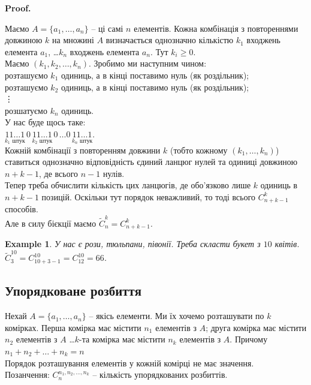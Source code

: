 \documentclass[a4paper, 14pt]{extarticle}
\makeatletter
\theoremstyle{theoremdd}
\theoremstyle{theoremdd}
\theoremstyle{theoremdd}
\theoremstyle{theoremdd}
\theoremstyle{theoremdd}
\newtheorem{example}[theorem]{Example}
\theoremstyle{theoremdd}
\theoremstyle{theoremdd}
\theoremstyle{theoremdd}
\theoremstyle{theoremdd}
\theoremstyle{theoremdd}
\theoremstyle{theoremdd}
\theoremstyle{theoremdd}
\theoremstyle{theoremdd}
\theoremstyle{theoremdd}
\theoremstyle{theoremdd}
\renewenvironment{proof}[1][Proof.\\]{\par
\pushQED{\hfill \qed}%
\normalfont \topsep6\p@\@plus6\p@\relax
\trivlist
\item\relax
{\bfseries
#1\@addpunct{.}}\hspace\labelsep\ignorespaces
}{%
\popQED\endtrivlist\@endpefalse
}
\makeatother
\begin{document}
\begin{proof}
Маємо $A = \{a_1,\dots,a_n\}$ -- ці самі $n$ елементів. Кожна комбінація з повтореннями довжиною $k$ на множині $A$ визначається однозначно кількістю $k_1$ входжень елемента $a_1$, \dots $k_n$ входжень елемента $a_n$. Тут $k_i \geq 0$.\\
Маємо $(k_1,k_2,\dots,k_n)$. Зробимо ми наступним чином:\\
розташуємо $k_1$ одиниць, а в кінці поставимо нуль (як роздільник);\\
розташуємо $k_2$ одиниць, а в кінці поставимо нуль (як роздільник);\\
\vdots \\
розшатуємо $k_n$ одиниць.\\
У нас буде щось таке:\\
$\underset{k_1 \text{ штук}}{11 \dots 1}\,0\,\underset{k_2 \text{ штук}}{11 \dots 1}\,0\, \dots 0\,\underset{k_n \text{ штук}}{11 \dots 1}$.\\
Кожній комбінації з повторенням довжини $k$ (тобто кожному $(k_1,\dots,k_n)$) ставиться однозначно відповідність єдиний ланцюг нулей та одиниці довжиною $n+k-1$, де всього $n-1$ нулів. \\
Тепер треба обчислити кількість цих ланцюгів, де обо'язково лише $k$ одиниць в $n+k-1$ позицій. Оскільки тут порядок неважливий, то тоді всього $C_{n+k-1}^k$ способів.\\
Але в силу бієкції маємо $\tilde{C}_n^k = C_{n+k-1}^k$.
\end{proof}

\begin{example}
У нас є рози, тюльпани, півонії. Треба скласти букет з $10$ квітів.\\
$\tilde{C}_3^{10} = C_{10+3-1}^{10} = C_{12}^{10} = 66$.
\end{example}

\subsection{Упорядковане розбиття}
Нехай $A = \{a_1,\dots,a_n\}$ -- якісь елементи. Ми їх хочемо розташувати по $k$ комірках. Перша комірка має містити $n_1$ елементів з $A$; друга комірка має містити $n_2$ елементів з $A$ \dots $k$-та комірка має містити $n_k$ елементів з $A$. Причому $n_1 + n_2 + \dots + n_k = n$\\
Порядок розташування елементів у кожній комірці не має значення.\\
Позанчення: $C_{n}^{n_1,n_2,\dots,n_k}$ -- кількість упорядкованих розбиттів.
\end{document}
